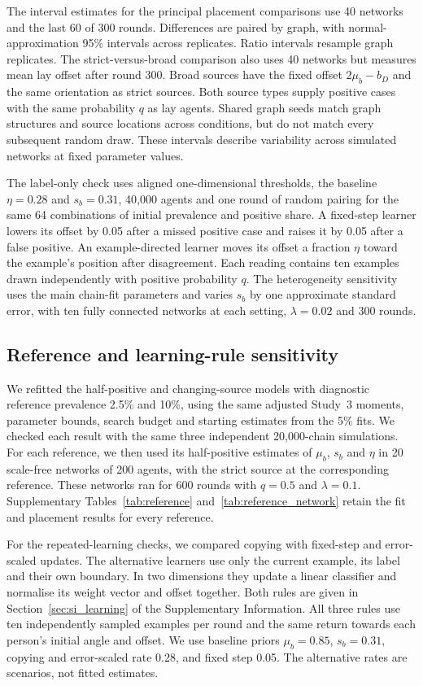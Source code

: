 \documentclass[11pt]{article}
\begin{document}
The interval estimates for the principal placement comparisons use 40 networks and the last 60 of 300 rounds. Differences are paired by graph, with normal-approximation 95\% intervals across replicates. Ratio intervals resample graph replicates. The strict-versus-broad comparison also uses 40 networks but measures mean lay offset after round 300. Broad sources have the fixed offset $2\mu_b-b_D$ and the same orientation as strict sources. Both source types supply positive cases with the same probability $q$ as lay agents. Shared graph seeds match graph structures and source locations across conditions, but do not match every subsequent random draw. These intervals describe variability across simulated networks at fixed parameter values.

The label-only check uses aligned one-dimensional thresholds, the baseline $\eta=0.28$ and $s_b=0.31$, 40{,}000 agents and one round of random pairing for the same 64 combinations of initial prevalence and positive share. A fixed-step learner lowers its offset by 0.05 after a missed positive case and raises it by 0.05 after a false positive. An example-directed learner moves its offset a fraction $\eta$ toward the example's position after disagreement. Each reading contains ten examples drawn independently with positive probability $q$. The heterogeneity sensitivity uses the main chain-fit parameters and varies $s_b$ by one approximate standard error, with ten fully connected networks at each setting, $\lambda=0.02$ and 300 rounds.

\subsection{Reference and learning-rule sensitivity}

We refitted the half-positive and changing-source models with diagnostic reference prevalence 2.5\% and 10\%, using the same adjusted Study~3 moments, parameter bounds, search budget and starting estimates from the 5\% fits. We checked each result with the same three independent 20{,}000-chain simulations. For each reference, we then used its half-positive estimates of $\mu_b$, $s_b$ and $\eta$ in 20 scale-free networks of 200 agents, with the strict source at the corresponding reference. These networks ran for 600 rounds with $q=0.5$ and $\lambda=0.1$. Supplementary Tables~\ref{tab:reference} and~\ref{tab:reference_network} retain the fit and placement results for every reference.

For the repeated-learning checks, we compared copying with fixed-step and error-scaled updates. The alternative learners use only the current example, its label and their own boundary. In two dimensions they update a linear classifier and normalise its weight vector and offset together. Both rules are given in Section~\ref{sec:si_learning} of the Supplementary Information. All three rules use ten independently sampled examples per round and the same return towards each person's initial angle and offset. We use baseline priors $\mu_b=0.85$, $s_b=0.31$, copying and error-scaled rate 0.28, and fixed step 0.05. The alternative rates are scenarios, not fitted estimates.
\end{document}
